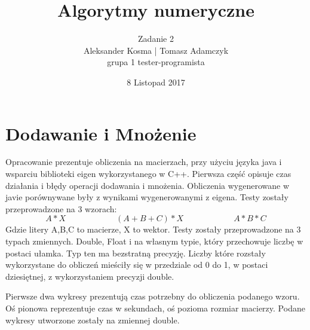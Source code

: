 \documentclass[8pt]{article}
\title{Algorytmy numeryczne}
\author{Zadanie 2 \\ Aleksander Kosma | Tomasz Adamczyk\\grupa 1 tester-programista}
\date{8 Listopad 2017}
\begin{document}
\maketitle 

\section{Dodawanie i Mnożenie}

Opracowanie prezentuje obliczenia na macierzach, przy użyciu języka java i wsparciu biblioteki eigen 
wykorzystanego w C++.
Pierwsza część opisuje czas działania i błędy operacji dodawania i mnożenia.
Obliczenia wygenerowane w javie porównywane były z wynikami wygenerowanymi z eigena.
Testy zostały przeprowadzone na 3 wzorach:
$$A * X\qquad \qquad \qquad  (A+B+C)*X \qquad \qquad \qquad A*B*C$$
Gdzie litery A,B,C to macierze, X to wektor.
Testy zostały przeprowadzone na 3 typach zmiennych. Double, Float i na własnym typie, który przechowuje
liczbę w postaci ułamka. Typ ten ma bezstratną precyzję. Liczby które rozstały
wykorzystane do obliczeń mieściły się w przedziale od 0 do 1, w postaci dziesiętnej, z wykorzystaniem precyzji double.

Pierwsze dwa wykresy prezentują czas potrzebny do obliczenia podanego wzoru. Oś pionowa reprezentuje czas w sekundach,
oś pozioma rozmiar macierzy. Podane wykresy utworzone zostały  na zmiennej double.\\
\begin{center}
\end{center}
\end{document}

